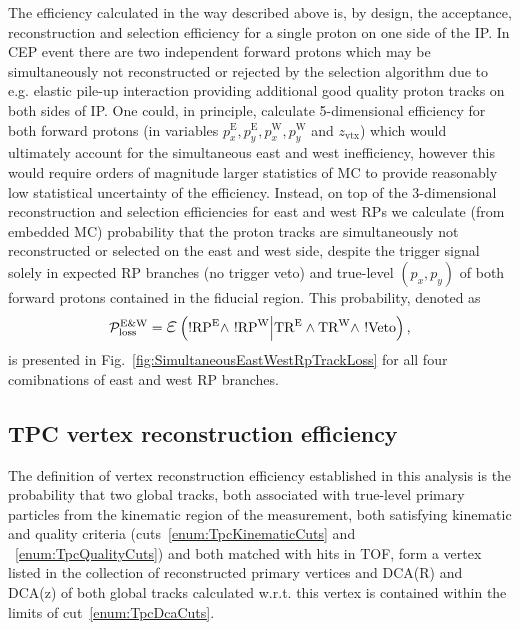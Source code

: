 

The efficiency calculated in the way described above is, by design, the acceptance, reconstruction and selection efficiency for a single proton on one side of the IP. In CEP event there are two independent forward protons which may be simultaneously not reconstructed or rejected by the selection algorithm due to e.g. elastic pile-up interaction providing additional good quality proton tracks on both sides of IP. One could, in principle, calculate 5-dimensional efficiency for both forward protons (in variables $p_{x}^{\text{E}}, p_{y}^{\text{E}}, p_{x}^{\text{W}}, p_{y}^{\text{W}}$ and $z_{\text{vtx}}$) which would ultimately account for the simultaneous east and west inefficiency, however this would require orders of magnitude larger statistics of MC to provide reasonably low statistical uncertainty of the efficiency. Instead, on top of the 3-dimensional reconstruction and selection efficiencies for east and west RPs we calculate (from embedded MC) probability that the proton tracks are simultaneously not reconstructed or selected on the east and west side, despite the trigger signal solely in expected RP branches (no trigger veto) and true-level $(p_{x}, p_{y})$ of both forward protons contained in the fiducial region. This probability, denoted as
\begin{equation}
\mathcal{P}^{\text{E\&W}}_{\text{loss}} = \mbox{\LARGE$\varepsilon$}\left(!\RPE\land~!\RPW\Big|\TRE\land\TRW\land~!\V\Big.\right),
\end{equation}
 is presented in Fig.~\ref{fig:SimultaneousEastWestRpTrackLoss} for all four comibnations of east and west RP branches.





\subsection{TPC vertex reconstruction efficiency}\label{sec:tpcVxRecoEff}

The definition of vertex reconstruction efficiency established in this analysis is the probability that two global tracks, both associated with true-level primary particles from the kinematic region of the measurement, both satisfying kinematic and quality criteria (cuts~\ref{enum:TpcKinematicCuts} and ~\ref{enum:TpcQualityCuts}) and both matched with hits in TOF, form a vertex listed in the collection of reconstructed primary vertices and DCA(R) and DCA(z) of both global tracks calculated w.r.t. this vertex is contained within the limits of cut~\ref{enum:TpcDcaCuts}.

